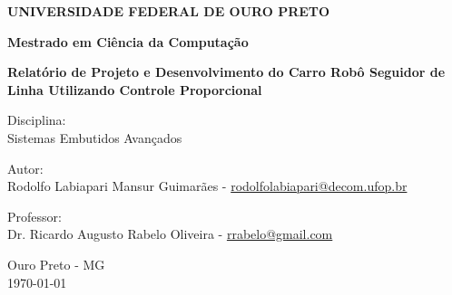 \documentclass[portugues, brazil, a4paper,12pt]{article}
\begin{document}
\begin{titlepage}
  \begin{center}
    \begin{Large}
      \textbf{UNIVERSIDADE FEDERAL DE OURO PRETO}
    \end{Large}
  \end{center}

  \begin{center}
    \begin{large}
      \textbf{Mestrado em Ciência da Computação} \\[1.4cm]
    \end{large}
  \end{center}

  \vfill

  \begin{center}
    \begin{large}
      \textbf{Relatório de Projeto e Desenvolvimento do Carro Robô Seguidor de Linha Utilizando Controle Proporcional}
    \end{large}
  \end{center}

  \vfill

  \begin{center}
    \begin{large}
      Disciplina: \\
		Sistemas Embutidos Avançados
    \end{large}
  \end{center}

  \vfill

  \begin{center}
    \begin{large}
      Autor: \\
		Rodolfo Labiapari Mansur Guimarães - \url{rodolfolabiapari@decom.ufop.br}
    \end{large}
  \end{center}

	\vfill

  \begin{center}
    \begin{large}
      Professor: \\
      Dr. Ricardo Augusto Rabelo Oliveira - \url{rrabelo@gmail.com}
    \end{large}
  \end{center}

  \vfill

  \begin{center}
    \begin{large}
      Ouro Preto - MG \\
      \today \\
    \end{large}
  \end{center}

\clearpage
\tableofcontents
\end{titlepage}
\end{document}
